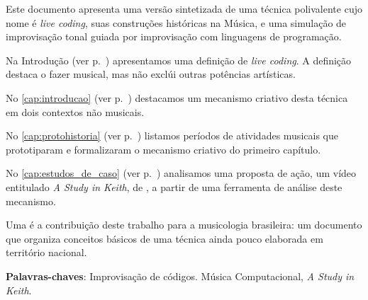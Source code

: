 
\setlength{\absparsep}{18pt} %
\begin{resumo}

Este documento apresenta uma versão sintetizada de uma técnica polivalente cujo nome é \emph{live coding}, suas construções históricas na Música, e uma simulação de improvisação tonal guiada por improvisação com linguagens de programação.

Na Introdução (ver p.~\pageref{cap:intro}) apresentamos uma definição de \emph{live coding}. A definição destaca o fazer musical, mas não exclúi outras potências artísticas. 

No \autoref{cap:introducao} (ver p.~\pageref{cap:introducao}) destacamos um mecanismo criativo desta técnica em dois contextos não musicais.

No \autoref{cap:protohistoria} (ver p.~\pageref{cap:protohistoria}) listamos  períodos de atividades musicais que prototiparam e formalizaram o mecanismo criativo do primeiro capítulo.

No \autoref{cap:estudos_de_caso} (ver p.~\pageref{cap:estudos_de_caso}) analisamos uma proposta de ação, 
um vídeo entitulado \emph{A Study in Keith}, de , a partir de uma ferramenta de análise deste mecanismo.

Uma é a contribuição deste trabalho para a musicologia brasileira: um documento que organiza conceitos básicos de uma técnica ainda pouco elaborada em território nacional.

\vspace{\onelineskip}
\noindent
\textbf{Palavras-chaves}: Improvisação de códigos. Música Computacional, \emph{A Study in Keith}.
\end{resumo}

